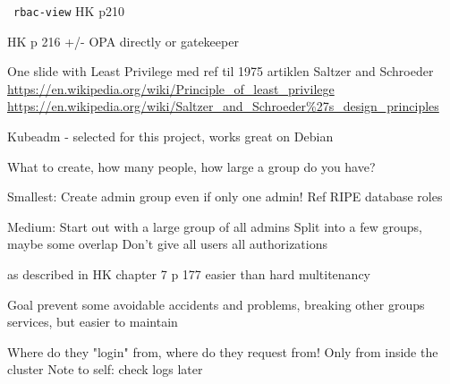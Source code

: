 \documentclass[Screen16to9,17pt]{foils}
\begin{document}
\faWrench\ \verb+rbac-view+ HK p210



\begin{list2}
\item
\end{list2}
HK p 216 +/- OPA directly or gatekeeper

One slide with Least Privilege med ref til 1975 artiklen Saltzer and Schroeder\\
\url{https://en.wikipedia.org/wiki/Principle_of_least_privilege}\\
\url{https://en.wikipedia.org/wiki/Saltzer_and_Schroeder%27s_design_principles}

Kubeadm - selected for this project, works great on Debian


\begin{list2}
\item
\end{list2}


\begin{list2}
\item
\end{list2}
What to create, how many people, how large a group do you have?

Smallest:
Create admin group even if only one admin! Ref RIPE database roles

Medium:
Start out with a large group of all admins
Split into a few groups, maybe some overlap
Don't give all users all authorizations


\begin{list2}
\item
\end{list2}
as described in HK chapter 7 p 177
easier than hard multitenancy

Goal prevent some avoidable accidents and problems, breaking other groups services, but easier to maintain



\begin{list2}
\item
\end{list2}
Where do they "login" from, where do they request from! Only from inside the cluster
Note to self: check logs later

\end{document}
